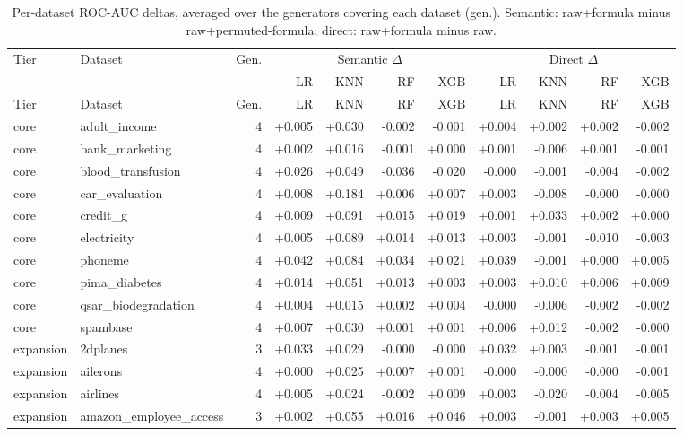 \begin{longtable}{llr rrrr rrrr}
\caption{Per-dataset ROC-AUC deltas, averaged over the generators covering each dataset (gen.). Semantic: raw+formula minus raw+permuted-formula; direct: raw+formula minus raw.}\label{tab:per-dataset}\\
\toprule
Tier & Dataset & Gen. & \multicolumn{4}{c}{Semantic $\Delta$} & \multicolumn{4}{c}{Direct $\Delta$} \\
 & & & LR & KNN & RF & XGB & LR & KNN & RF & XGB \\
\midrule
\endfirsthead
\toprule
Tier & Dataset & Gen. & LR & KNN & RF & XGB & LR & KNN & RF & XGB \\
\midrule
\endhead
\bottomrule
\endfoot
core & adult\_income & 4 & +0.005 & +0.030 & -0.002 & -0.001 & +0.004 & +0.002 & +0.002 & -0.002 \\
core & bank\_marketing & 4 & +0.002 & +0.016 & -0.001 & +0.000 & +0.001 & -0.006 & +0.001 & -0.001 \\
core & blood\_transfusion & 4 & +0.026 & +0.049 & -0.036 & -0.020 & -0.000 & -0.001 & -0.004 & -0.002 \\
core & car\_evaluation & 4 & +0.008 & +0.184 & +0.006 & +0.007 & +0.003 & -0.008 & -0.000 & -0.000 \\
core & credit\_g & 4 & +0.009 & +0.091 & +0.015 & +0.019 & +0.001 & +0.033 & +0.002 & +0.000 \\
core & electricity & 4 & +0.005 & +0.089 & +0.014 & +0.013 & +0.003 & -0.001 & -0.010 & -0.003 \\
core & phoneme & 4 & +0.042 & +0.084 & +0.034 & +0.021 & +0.039 & -0.001 & +0.000 & +0.005 \\
core & pima\_diabetes & 4 & +0.014 & +0.051 & +0.013 & +0.003 & +0.003 & +0.010 & +0.006 & +0.009 \\
core & qsar\_biodegradation & 4 & +0.004 & +0.015 & +0.002 & +0.004 & -0.000 & -0.006 & -0.002 & -0.002 \\
core & spambase & 4 & +0.007 & +0.030 & +0.001 & +0.001 & +0.006 & +0.012 & -0.002 & -0.000 \\
expansion & 2dplanes & 3 & +0.033 & +0.029 & -0.000 & -0.000 & +0.032 & +0.003 & -0.001 & -0.001 \\
expansion & ailerons & 4 & +0.000 & +0.025 & +0.007 & +0.001 & -0.000 & -0.000 & -0.000 & -0.001 \\
expansion & airlines & 4 & +0.005 & +0.024 & -0.002 & +0.009 & +0.003 & -0.020 & -0.004 & -0.005 \\
expansion & amazon\_employee\_access & 3 & +0.002 & +0.055 & +0.016 & +0.046 & +0.003 & -0.001 & +0.003 & +0.005 \\

\end{longtable}
